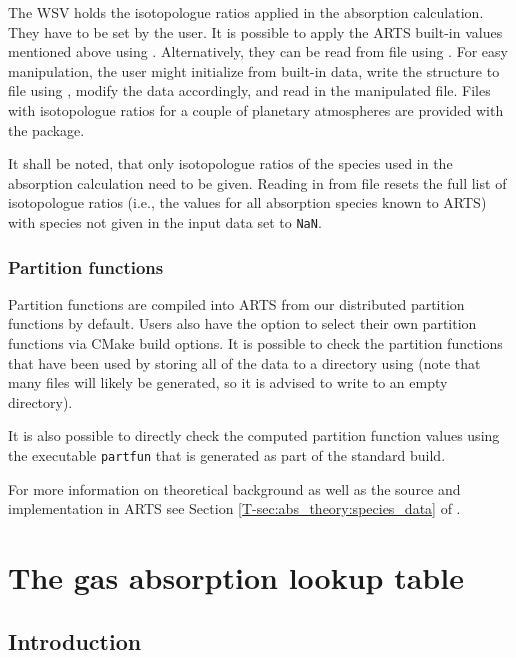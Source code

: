 The WSV  holds the isotopologue ratios applied in
the absorption calculation. They have to be set by the user. It is possible to
apply the ARTS built-in values mentioned above using
. Alternatively, they can be read
from file using . For easy manipulation, the user might
initialize  from built-in data, write the
 structure to file using ,
modify the data accordingly, and read in the manipulated file.
Files with isotopologue ratios for a couple of planetary atmospheres are
provided with the  package.

It shall be noted, that only isotopologue ratios of the species used in the
absorption calculation need to be given. Reading in from file resets the full
list of isotopologue ratios (i.e., the values for all absorption species known to
ARTS) with species not given in the input data set to \verb|NaN|.

\subsubsection{Partition functions}
\label{sec:absorption:partition}

Partition functions are compiled into ARTS from our distributed partition functions
by default.  Users also have the option to select their own partition functions via
CMake build options.  It is possible to check the partition functions that have been
used by storing all of the data to a directory using 
(note that many files will likely be generated, so it is advised to write to an empty directory).

It is also possible to directly check the computed partition function values using the
executable \verb|partfun| that is generated as part of the standard build.

For more
information on theoretical background as well as the source and implementation
in ARTS see Section \ref{T-sec:abs_theory:species_data} of \theory.


\section{The gas absorption lookup table}
\label{sec:absorption:lookup}

\subsection{Introduction}

